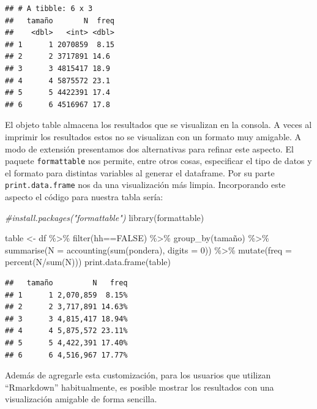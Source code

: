 \documentclass[
]{book}
\newenvironment{Shaded}{\begin{snugshade}}{\end{snugshade}}
\newcommand{\AttributeTok}[1]{\textcolor[rgb]{0.77,0.63,0.00}{#1}}
\newcommand{\CommentTok}[1]{\textcolor[rgb]{0.56,0.35,0.01}{\textit{#1}}}
\newcommand{\ConstantTok}[1]{\textcolor[rgb]{0.00,0.00,0.00}{#1}}
\newcommand{\DecValTok}[1]{\textcolor[rgb]{0.00,0.00,0.81}{#1}}
\newcommand{\FunctionTok}[1]{\textcolor[rgb]{0.00,0.00,0.00}{#1}}
\newcommand{\NormalTok}[1]{#1}
\newcommand{\OtherTok}[1]{\textcolor[rgb]{0.56,0.35,0.01}{#1}}
\newcommand{\SpecialCharTok}[1]{\textcolor[rgb]{0.00,0.00,0.00}{#1}}
\begin{document}
\begin{verbatim}
## # A tibble: 6 x 3
##   tamaño       N  freq
##    <dbl>   <int> <dbl>
## 1      1 2070859  8.15
## 2      2 3717891 14.6 
## 3      3 4815417 18.9 
## 4      4 5875572 23.1 
## 5      5 4422391 17.4 
## 6      6 4516967 17.8
\end{verbatim}

El objeto table almacena los resultados que se visualizan en la consola. A veces al imprimir los resultados estos no se visualizan con un formato muy amigable. A modo de extensión presentamos dos alternativas para refinar este aspecto. El paquete \texttt{formattable} nos permite, entre otros cosas, especificar el tipo de datos y el formato para distintas variables al generar el dataframe. Por su parte \texttt{print.data.frame} nos da una visualización más limpia. Incorporando este aspecto el código para nuestra tabla sería:

\begin{Shaded}
\begin{Highlighting}[]
\CommentTok{\#install.packages("formattable")}
\FunctionTok{library}\NormalTok{(formattable)}

\NormalTok{table }\OtherTok{\textless{}{-}}\NormalTok{ df }\SpecialCharTok{\%\textgreater{}\%} \FunctionTok{filter}\NormalTok{(hh}\SpecialCharTok{==}\ConstantTok{FALSE}\NormalTok{) }\SpecialCharTok{\%\textgreater{}\%} \FunctionTok{group\_by}\NormalTok{(tamaño) }\SpecialCharTok{\%\textgreater{}\%} \FunctionTok{summarise}\NormalTok{(}\AttributeTok{N =} \FunctionTok{accounting}\NormalTok{(}\FunctionTok{sum}\NormalTok{(pondera), }\AttributeTok{digits =} \DecValTok{0}\NormalTok{)) }\SpecialCharTok{\%\textgreater{}\%} 
                                                              \FunctionTok{mutate}\NormalTok{(}\AttributeTok{freq =} \FunctionTok{percent}\NormalTok{(N}\SpecialCharTok{/}\FunctionTok{sum}\NormalTok{(N)))}
\FunctionTok{print.data.frame}\NormalTok{(table)}
\end{Highlighting}
\end{Shaded}

\begin{verbatim}
##   tamaño         N   freq
## 1      1 2,070,859  8.15%
## 2      2 3,717,891 14.63%
## 3      3 4,815,417 18.94%
## 4      4 5,875,572 23.11%
## 5      5 4,422,391 17.40%
## 6      6 4,516,967 17.77%
\end{verbatim}

Además de agregarle esta customización, para los usuarios que utilizan ``Rmarkdown'' habitualmente, es posible mostrar los resultados con una visualización amigable de forma sencilla.
\end{document}
